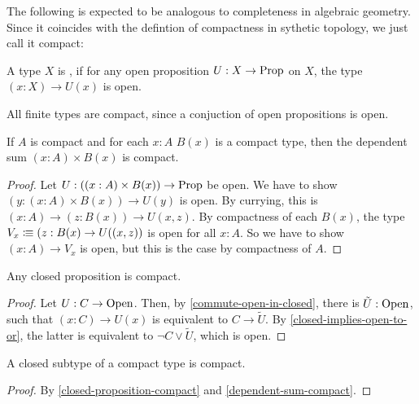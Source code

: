 
The following is expected to be analogous to completeness in algebraic geometry.
Since it coincides with the defintion of compactness in sythetic topology,
we just call it compact:

\begin{definition}
  A type $X$ is ,
  if for any open proposition $U:X\to\mathrm{Prop}$ on $X$,
  the type $(x:X)\to U(x)$ is open.
\end{definition}

\begin{example}
  All finite types are compact, since a conjuction of open propositions is open.
\end{example}

\begin{lemma}
  \label{dependent-sum-compact}
  If $A$ is compact and for each $x:A$ $B(x)$ is a compact type,
  then the dependent sum $(x:A)\times B(x)$ is compact.
\end{lemma}

\begin{proof}
  Let $U:((x:A)\times B(x))\to\mathrm{Prop}$ be open.
  We have to show $(y:(x:A)\times B(x))\to U(y)$ is open.
  By currying, this is $(x:A)\to (z:B(x))\to U(x,z)$.
  By compactness of each $B(x)$, the type $V_x\vcentcolon\mspace{-1.2mu}\equiv (z:B(x)\to U((x,z))$ is open for all $x:A$.
  So we have to show $(x:A)\to V_x$ is open, but this is the case by compactness of $A$.
\end{proof}

\begin{lemma}
  \label{closed-proposition-compact}
  Any closed proposition is compact.
\end{lemma}

\begin{proof}
  Let $U:C\to\mathrm{Open}$.
  Then, by \cref{commute-open-in-closed}, there is $\tilde{U}:\mathrm{Open}$,
  such that $(x:C)\to U(x)$ is equivalent to $C\to\tilde{U}$.
  By \cref{closed-implies-open-to-or}, the latter is equivalent to $\neg C\vee \tilde{U}$,
  which is open.
\end{proof}

\begin{lemma}
  \label{closed-subtype-compact}
  A closed subtype of a compact type is compact.
\end{lemma}

\begin{proof}
  By \cref{closed-proposition-compact} and \cref{dependent-sum-compact}.
\end{proof}